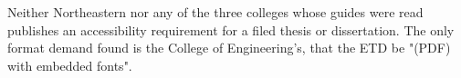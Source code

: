 %
%
%


	{Neither Northeastern nor any of the three colleges whose guides were read
	 publishes an accessibility requirement for a filed thesis or dissertation.
	 The only format demand found is the College of Engineering's, that the ETD
	 be "(PDF) with embedded fonts".}


